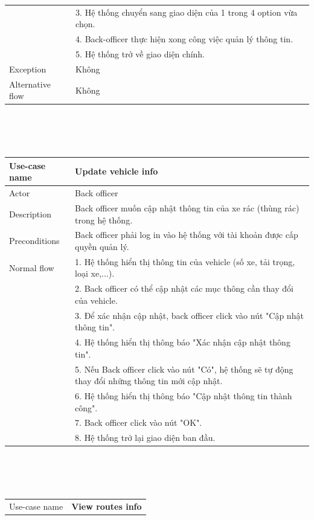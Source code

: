 \documentclass[a4paper]{article}
\begin{document}
\begin{enumerate}
\begin{enumerate}
\begin{tabular}{| p{3cm} | p{10cm} |}
        &3. Hệ thống chuyển sang giao diện của 1 trong 4 option vừa chọn. \\
        &4. Back-officer thực hiện xong công việc quản lý thông tin. \\
        &5. Hệ thống trở về giao diện chính.\\
        \hline
        Exception & Không \\
        \hline
        Alternative flow & Không \\
        \hline
    \end{tabular}
    \\ \\ \\
    \begin{tabular}{|p{3cm} | p{10cm}|}
    \hline
         Use-case name & \textbf{Update vehicle info}  \\
         \hline
         Actor & Back officer \\
         \hline 
         Description & Back officer muốn cập nhật thông tin của xe rác (thùng rác) trong hệ thống. \\
         \hline
         Preconditions & Back officer phải log in vào hệ thống với tài khoản được cấp quyền quản lý.\\
         \hline
         Normal flow 
         &1. Hệ thống hiển thị thông tin của vehicle (số xe, tải trọng, loại xe,...). \\
         &2. Back officer có thể cập nhật các mục thông cần thay đổi của vehicle. \\
         &3. Để xác nhận cập nhật, back officer click vào nút "Cập nhật thông tin". \\
         &4. Hệ thống hiển thị thông báo "Xác nhận cập nhật thông tin". \\ 
         &5. Nếu Back officer click vào nút "Có", hệ thống sẽ tự động thay đổi những thông tin mới cập nhật. \\
         &6. Hệ thống hiển thị thông báo "Cập nhật thông tin thành công". \\
         &7. Back officer click vào nút "OK". \\
         &8. Hệ thống trở lại giao diện ban đầu. \\
         \hline
    \end{tabular}
    \\ \\ \\
    \begin{tabular}{|p{3cm} |p{10cm} |}
         \hline
         Use-case name & \textbf{View routes info}  \\

\end{tabular}
\end{enumerate}
\end{enumerate}
\end{document}
